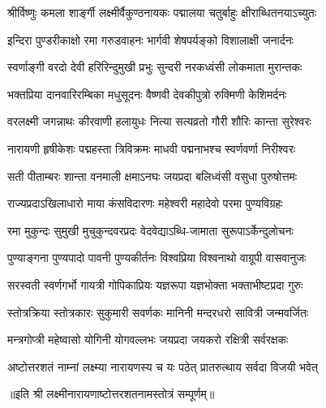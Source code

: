 
\twolineshloka
{श्रीर्विष्णुः कमला शार्ङ्गी लक्ष्मीर्वैकुण्ठनायकः}
{पद्मालया चतुर्बाहुः क्षीराब्धितनयाऽच्युतः}%

\twolineshloka
{इन्दिरा पुण्डरीकाक्षो रमा गरुडवाहनः}
{भार्गवी शेषपर्यङ्को विशालाक्षी जनार्दनः}%

\twolineshloka
{स्वर्णाङ्गी वरदो देवी हरिरिन्दुमुखी प्रभुः}
{सुन्दरी नरकध्वंसी लोकमाता मुरान्तकः}%

\twolineshloka
{भक्तप्रिया दानवारिरम्बिका मधुसूदनः}
{वैष्णवी देवकीपुत्रो रुक्मिणी केशिमर्दनः}%

\twolineshloka
{वरलक्ष्मी जगन्नाथः कीरवाणी हलायुधः}
{नित्या सत्यव्रतो गौरी शौरिः कान्ता सुरेश्वरः}

\twolineshloka
{नारायणी हृषीकेशः पद्महस्ता त्रिविक्रमः}
{माधवी पद्मनाभश्च स्वर्णवर्णा निरीश्वरः}

\twolineshloka
{सती पीताम्बरः शान्ता वनमाली क्षमाऽनघः}
{जयप्रदा बलिध्वंसी वसुधा पुरुषोत्तमः}

\twolineshloka
{राज्यप्रदाऽखिलाधारो माया कंसविदारणः}
{महेश्वरी महादेवो परमा पुण्यविग्रहः}


\twolineshloka
{रमा मुकुन्दः सुमुखी मुचुकुन्दवरप्रदः}
{वेदवेद्याऽब्धि-जामाता सुरूपाऽर्केन्दुलोचनः}

\twolineshloka
{पुण्याङ्गना पुण्यपादो पावनी पुण्यकीर्तनः}
{विश्वप्रिया विश्वनाथो वाग्रूपी वासवानुजः}

\twolineshloka
{सरस्वती स्वर्णगर्भो गायत्री गोपिकाप्रियः}
{यज्ञरूपा यज्ञभोक्ता भक्ताभीष्टप्रदा गुरुः}

\twolineshloka
{स्तोत्रक्रिया स्तोत्रकारः सुकुमारी सवर्णकः}
{मानिनी मन्दरधरो सावित्री जन्मवर्जितः}

\twolineshloka
{मन्त्रगोप्त्री महेष्वासो योगिनी योगवल्लभः}
{जयप्रदा जयकरो रक्षित्री सर्वरक्षकः}

\twolineshloka
{अष्टोत्तरशतं नाम्नां लक्ष्म्या नारायणस्य च}
{यः पठेत् प्रातरुत्थाय सर्वदा विजयी भवेत्}

॥इति श्री लक्ष्मीनारायणाष्टोत्तरशतनामस्तोत्रं सम्पूर्णम्॥